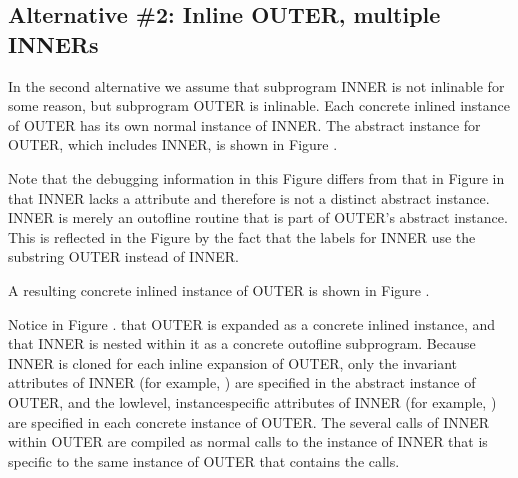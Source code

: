 \subsection{Alternative \#2: Inline OUTER, multiple INNERs}
\label{app:inlineoutermultiipleinners}


In the second alternative we assume that subprogram INNER
is not inlinable for some reason, but subprogram OUTER is
inlinable. 
Each concrete inlined instance of OUTER has its
own normal instance of INNER. 
The abstract instance for OUTER,
which includes INNER, is shown in 
Figure .

Note that the debugging information in this Figure differs from
that in 
Figure 
in that INNER lacks a 
 attribute
and therefore is not a distinct abstract instance. INNER
is merely an out\dash of\dash line routine that is part of OUTER\textquoteright s
abstract instance. This is reflected in the Figure by
the fact that the labels for INNER use the substring OUTER
instead of INNER.

A resulting 
concrete inlined instance of OUTER is shown in
Figure .

Notice in 
Figure .
that OUTER is expanded as a concrete
inlined instance, and that INNER is nested within it as a
concrete out\dash of\dash line subprogram. Because INNER is cloned
for each inline expansion of OUTER, only the invariant
attributes of INNER 
(for example, ) are specified
in the abstract instance of OUTER, and the low\dash level,
instance\dash specific attributes of INNER (for example,
) are specified in 
each concrete instance of OUTER.
The several calls of INNER within OUTER are compiled as normal
calls to the instance of INNER that is specific to the same
instance of OUTER that contains the calls.

